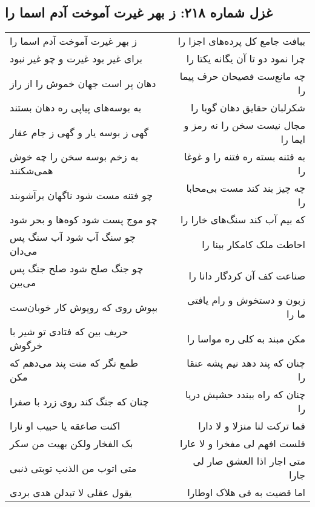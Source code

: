 \begin{center}
\section*{غزل شماره ۲۱۸: ز بهر غیرت آموخت آدم اسما را}
\label{sec:0218}
\begin{longtable}{l p{0.5cm} r}
ز بهر غیرت آموخت آدم اسما را
&&
ببافت جامع کل پرده‌های اجزا را
\\
برای غیر بود غیرت و چو غیر نبود
&&
چرا نمود دو تا آن یگانه یکتا را
\\
دهان پر است جهان خموش را از راز
&&
چه مانع‌ست فصیحان حرف پیما را
\\
به بوسه‌های پیاپی ره دهان بستند
&&
شکرلبان حقایق دهان گویا را
\\
گهی ز بوسه یار و گهی ز جام عقار
&&
مجال نیست سخن را نه رمز و ایما را
\\
به زخم بوسه سخن را چه خوش همی‌شکنند
&&
به فتنه بسته ره فتنه را و غوغا را
\\
چو فتنه مست شود ناگهان برآشوبند
&&
چه چیز بند کند مست بی‌محابا را
\\
چو موج پست شود کوه‌ها و بحر شود
&&
که بیم آب کند سنگ‌های خارا را
\\
چو سنگ آب شود آب سنگ پس می‌دان
&&
احاطت ملک کامکار بینا را
\\
چو جنگ صلح شود صلح جنگ پس می‌بین
&&
صناعت کف آن کردگار دانا را
\\
بپوش روی که روپوش کار خوبان‌ست
&&
زبون و دستخوش و رام یافتی ما را
\\
حریف بین که فتادی تو شیر با خرگوش
&&
مکن مبند به کلی ره مواسا را
\\
طمع نگر که منت پند می‌دهم که مکن
&&
چنان که پند دهد نیم پشه عنقا را
\\
چنان که جنگ کند روی زرد با صفرا
&&
چنان که راه ببندد حشیش دریا را
\\
اکنت صاعقه یا حبیب او نارا
&&
فما ترکت لنا منزلا و لا دارا
\\
بک الفخار ولکن بهیت من سکر
&&
فلست افهم لی مفخرا و لا عارا
\\
متی اتوب من الذنب توبتی ذنبی
&&
متی اجار اذا العشق صار لی جارا
\\
یقول عقلی لا تبدلن هدی بردی
&&
اما قضیت به فی هلاک اوطارا
\\
\end{longtable}
\end{center}
